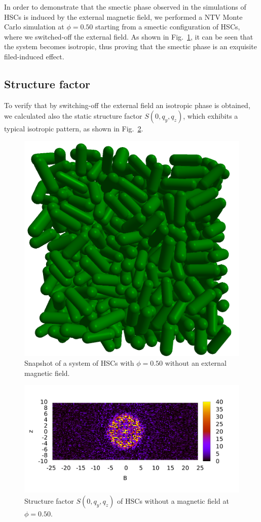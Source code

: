\documentclass[aip,graphicx]{revtex4-1} %
\begin{document}
In order to demonstrate that the smectic phase observed in the simulations of HSCs is induced by the external magnetic field, 
we performed a NTV Monte Carlo simulation at $\phi=0.50$ starting from a smectic configuration  
of HSCs, where we switched-off the external field. 
As shown in Fig.~\ref{fig:noB_snapshot}, it can be seen that the system becomes isotropic, 
thus proving that the smectic phase is an exquisite filed-induced effect.

\subsection{Structure factor}
To verify that by switching-off the external field an isotropic phase is obtained, 
we calculated also the static structure factor $S(0, q_y, q_z)$, which exhibits a typical isotropic pattern, 
as shown in Fig.~\ref{fig:Syz_noB}.


\begin{figure}
    \centering
    \includegraphics[width=0.4\columnwidth]{Isotropic_phase_snap.png}
    \caption{Snapshot of a system of HSCs with $\phi = 0.50$ without an external magnetic field.}\label{fig:noB_snapshot}
\end{figure}

\begin{figure}
    \centering
    \includegraphics[width=0.7\columnwidth]{Syz_noB.png}
    \caption{Structure factor $S(0, q_y, q_z)$ of HSCs without a magnetic field at $\phi=0.50$.}\label{fig:Syz_noB}
\end{figure}
\end{document}
